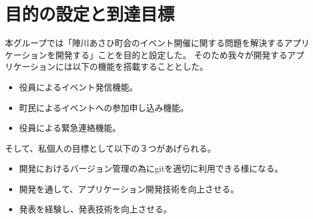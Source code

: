 \section{目的の設定と到達目標}
本グループでは「陣川あさひ町会のイベント開催に関する問題を解決するアプリケーションを開発する」ことを目的と設定した。
そのため我々が開発するアプリケーションには以下の機能を搭載することとした。
\begin{itemize}
    \item 役員によるイベント発信機能。
    \item 町民によるイベントへの参加申し込み機能。
    \item 役員による緊急連絡機能。
\end{itemize}
そして、私個人の目標として以下の３つがあげられる。
\begin{itemize}
    \item 開発におけるバージョン管理の為にgitを適切に利用できる様になる。
    \item 開発を通して、アプリケーション開発技術を向上させる。
    \item 発表を経験し、発表技術を向上させる。
\end{itemize}
